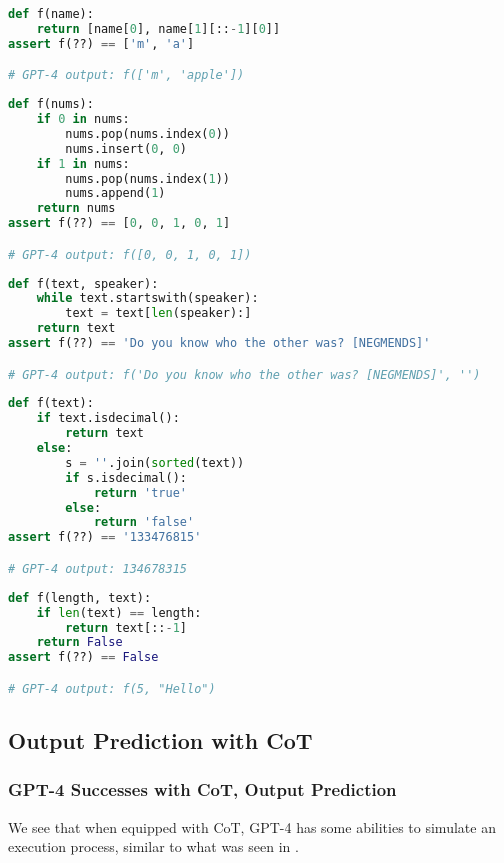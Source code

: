 \begin{lstlisting}[language=python]
def f(name):
    return [name[0], name[1][::-1][0]]
assert f(??) == ['m', 'a']

# GPT-4 output: f(['m', 'apple'])
\end{lstlisting}

\begin{lstlisting}[language=python]
def f(nums):
    if 0 in nums:
        nums.pop(nums.index(0))
        nums.insert(0, 0)
    if 1 in nums:
        nums.pop(nums.index(1))
        nums.append(1)
    return nums
assert f(??) == [0, 0, 1, 0, 1]

# GPT-4 output: f([0, 0, 1, 0, 1])
\end{lstlisting}

\begin{lstlisting}[language=python]
def f(text, speaker):
    while text.startswith(speaker):
        text = text[len(speaker):]
    return text
assert f(??) == 'Do you know who the other was? [NEGMENDS]'

# GPT-4 output: f('Do you know who the other was? [NEGMENDS]', '')
\end{lstlisting}

\begin{lstlisting}[language=python]
def f(text):
    if text.isdecimal():
        return text
    else:
        s = ''.join(sorted(text))
        if s.isdecimal():
            return 'true'
        else:
            return 'false'
assert f(??) == '133476815'

# GPT-4 output: 134678315
\end{lstlisting}

\begin{lstlisting}[language=python]
def f(length, text):
    if len(text) == length:
        return text[::-1]
    return False
assert f(??) == False

# GPT-4 output: f(5, "Hello")
\end{lstlisting}

\subsection{Output Prediction with CoT}
\label{sub:output_cot}
\subsubsection{GPT-4 Successes with CoT, Output Prediction}
We see that when equipped with CoT, GPT-4 has some abilities to simulate an execution process, similar to what was seen in \citep{nye2021show}.

